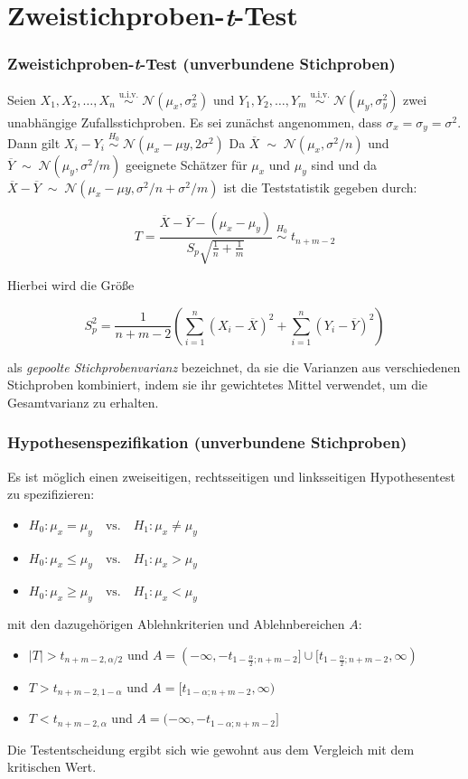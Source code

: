 \documentclass{beamer}
\begin{document}
\section{Zweistichproben-\textit{t}-Test}
\frame{\sectionpage}
\begin{frame}
\frametitle{Zweistichproben-\textit{t}-Test (unverbundene Stichproben)}
Seien $X_1, X_2, \dots, X_n  \; \stackrel{\mathrm{u.i.v.}}{\sim} \; \mathcal{N}(\mu_{x}, \sigma_{x}^2)$ und $Y_1, Y_2, \dots, Y_m  \; \stackrel{\mathrm{u.i.v.}}{\sim} \; \mathcal{N}(\mu_{y}, \sigma_{y}^2)$ zwei unabhängige Zufallsstichproben. Es sei zunächst angenommen, dass $\sigma_{x} = \sigma_{y} = \sigma^2$. Dann gilt $X_{i} -Y_{i}  \; \stackrel{H_0}{\sim} \; \mathcal{N}(\mu_{x} -\mu{y}, 2\sigma^2)$ Da $\overline{X}\; \sim \;\mathcal{N}(\mu_{x}, \sigma^2/n) $ und $\overline{Y}\; \sim \;\mathcal{N}(\mu_{y}, \sigma^2/m) $ geeignete Schätzer für $\mu_{x}$ und $\mu_{y}$ sind und da $\overline{X} -\overline{Y}\; \sim \;\mathcal{N}(\mu_{x}-\mu{y},\sigma^2/n + \sigma^2/m) $ ist die Teststatistik gegeben durch:

\[T=\frac{\overline{X}-\overline{Y} - (\mu_{x}-\mu_{y})}{S_{p}\sqrt{\frac{1}{n}+\frac{1}{m}}}  \; \stackrel{H_0}{\sim} \; t_{n+m-2}\]

Hierbei wird die Größe

\[S_{p}^2=\frac{1}{n+m-2}\left(\sum_{i=1}^n (X_i-\overline X )^2 + \sum_{i=1}^n (Y_i-\overline Y )^2  \right)\]

als \textit{gepoolte Stichprobenvarianz} bezeichnet, da sie die Varianzen aus verschiedenen Stichproben kombiniert, indem sie ihr gewichtetes Mittel  verwendet, um die Gesamtvarianz zu erhalten.
\end{frame}
\begin{frame}
\frametitle{Hypothesenspezifikation (unverbundene Stichproben)}

Es ist möglich einen zweiseitigen, rechtsseitigen und linksseitigen Hypothesentest zu spezifizieren:
\begin{itemize}
\item $H_0\colon \mu_{x} = \mu_{y} \quad \text{vs.} \quad H_1\colon \mu_{x} \ne \mu_{y}$
\item $H_0\colon \mu_{x} \leq \mu_{y} \quad \text{vs.} \quad H_1\colon \mu_{x} > \mu_{y}$
\item $H_0\colon \mu_{x} \geq \mu_{y} \quad \text{vs.} \quad H_1\colon \mu_{x} < \mu_{y}$
\end{itemize}
mit den dazugehörigen Ablehnkriterien und Ablehnbereichen $A$:
\begin{itemize}
\item $|T|>t_{n+m-2, \alpha/2}$ und $A =(-\infty,-t_{1-\frac{\alpha}2;n+m-2}]\cup [t_{1-\frac{\alpha}2;n+m-2},\infty)$
\item $T>t_{n+m-2, 1-\alpha}$ und $A = [t_{1-\alpha;n+m-2},\infty)$
\item $T < t_{n+m-2, \alpha}$ und $A = (-\infty,-t_{1-\alpha;n+m-2}]$
\end{itemize}
Die Testentscheidung ergibt sich wie gewohnt aus dem Vergleich mit dem kritischen Wert.
\end{frame}
\end{document}
